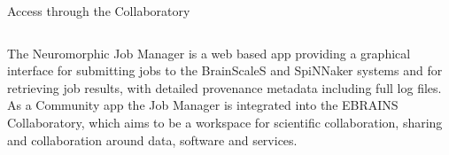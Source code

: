 \newlength{\shiftx}
\newlength{\shifty}
\setlength{\shiftx}{-500mm}
\setlength{\shifty}{11.1mm}

\begin{myblock2}{\Large Access through the Collaboratory \phantom{\Huge $\beta$}}
	
	
	\begin{figure}[t]
		\centering
	\end{figure}
	\vspace{-130mm}
	\begin{columns}[t]
		            
		\begin{normalsize}
			\justify
			\setlength{\parindent}{0mm} 
			The Neuromorphic Job Manager is a web based app providing a graphical interface for submitting jobs
			to the BrainScaleS and SpiNNaker systems and for retrieving job results,
			with detailed provenance metadata including full log files.\\[2mm]
			\justify 
			As a Community app the Job Manager is integrated into the EBRAINS Collaboratory, which aims to be a workspace for scientific collaboration,
			sharing and collaboration around data, software and services.    
			\\[24mm]
			\phantom{-}
		\end{normalsize}
		
	\end{columns}
	    

\end{myblock2}
